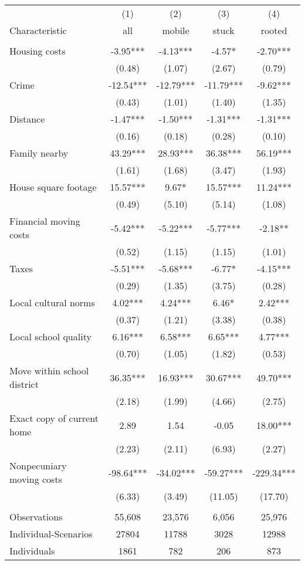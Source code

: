 \begin{tabular}{lcccc} \hline
 & (1) & (2) & (3) & (4) \\
Characteristic & all & mobile & stuck & rooted \\ \hline
 &  &  &  &  \\
Housing costs & -3.95*** & -4.13*** & -4.57* & -2.70*** \\
 & (0.48) & (1.07) & (2.67) & (0.79) \\
Crime & -12.54*** & -12.79*** & -11.79*** & -9.62*** \\
 & (0.43) & (1.01) & (1.40) & (1.35) \\
Distance & -1.47*** & -1.50*** & -1.31*** & -1.31*** \\
 & (0.16) & (0.18) & (0.28) & (0.10) \\
Family nearby & 43.29*** & 28.93*** & 36.38*** & 56.19*** \\
 & (1.61) & (1.68) & (3.47) & (1.93) \\
House square footage & 15.57*** & 9.67* & 15.57*** & 11.24*** \\
 & (0.49) & (5.10) & (5.14) & (1.08) \\
Financial moving costs & -5.42*** & -5.22*** & -5.77*** & -2.18** \\
 & (0.52) & (1.15) & (1.15) & (1.01) \\
Taxes & -5.51*** & -5.68*** & -6.77* & -4.15*** \\
 & (0.29) & (1.35) & (3.75) & (0.28) \\
Local cultural norms & 4.02*** & 4.24*** & 6.46* & 2.42*** \\
 & (0.37) & (1.21) & (3.38) & (0.38) \\
Local school quality & 6.16*** & 6.58*** & 6.65*** & 4.77*** \\
 & (0.70) & (1.05) & (1.82) & (0.53) \\
Move within school district & 36.35*** & 16.93*** & 30.67*** & 49.70*** \\
 & (2.18) & (1.99) & (4.66) & (2.75) \\
Exact copy of current home & 2.89 & 1.54 & -0.05 & 18.00*** \\
 & (2.23) & (2.11) & (6.93) & (2.27) \\
Nonpecuniary moving costs & -98.64*** & -34.02*** & -59.27*** & -229.34*** \\
 & (6.33) & (3.49) & (11.05) & (17.70) \\
 &  &  &  &  \\
Observations & 55,608 & 23,576 & 6,056 & 25,976 \\
Individual-Scenarios & 27804 & 11788 & 3028 & 12988 \\
 Individuals & 1861 & 782 & 206 & 873 \\ \hline
\end{tabular}
